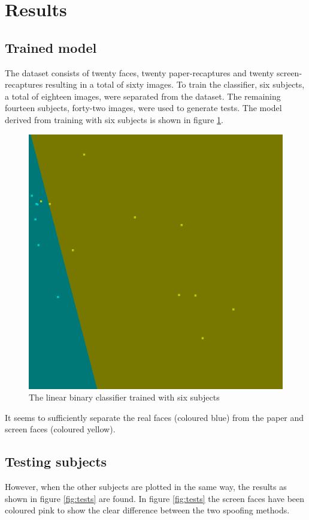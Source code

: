 \documentclass{sig-alternate-br}
\begin{document}
\section{Results} \label{results}

\subsection{Trained model} \label{model}
The dataset consists of twenty faces, twenty paper-recaptures and twenty screen-recaptures resulting in a total of sixty images. To train the classifier, six subjects, a total of eighteen images, were separated from the dataset. The remaining fourteen subjects, forty-two images, were used to generate tests. The model derived from training with six subjects is shown in figure \ref{fig:model}.

\begin{figure}[h]
	\includegraphics[scale=0.4]{model}
	\caption{The linear binary classifier trained with six subjects}
	\label{fig:model}
\end{figure}

It seems to sufficiently separate the real faces (coloured blue) from the paper and screen faces (coloured yellow).

\subsection{Testing subjects} \label{tests}
However, when the other subjects are plotted in the same way, the results as shown in figure \ref{fig:tests} are found. In figure \ref{fig:tests} the screen faces have been coloured pink to show the clear difference between the two spoofing methods.
\end{document}
